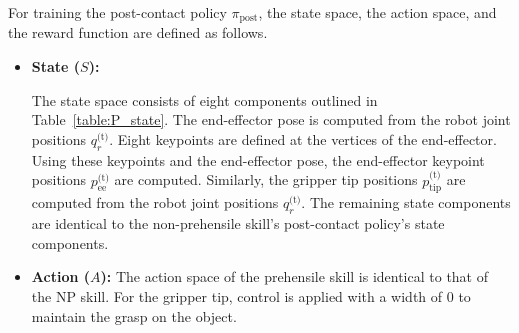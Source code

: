 For training the post-contact policy $\pi_\text{post}$, the state space, the action space, and the reward function are defined as follows. 

\begin{itemize}
    \medskip
    \item \textbf{State (\( S \)):}
    
    
    The state space consists of eight components outlined in Table~\ref{table:P_state}. %
     The end-effector pose is computed from the robot joint positions \( q^\text{(t)}_r \). Eight keypoints are defined at the vertices of the end-effector. Using these keypoints and the end-effector pose, the end-effector keypoint positions \( p^\text{(t)}_\text{ee} \) are computed. Similarly, the gripper tip positions \( p^\text{(t)}_\text{tip} \) are computed from the robot joint positions \( q^\text{(t)}_r \). The remaining state components are identical to the non-prehensile skill's post-contact policy's state components.
    

    \medskip
    
    \item \textbf{Action (\( A \)):} The action space of the prehensile skill is identical to that of the NP skill. For the gripper tip, control is applied with a width of 0 to maintain the grasp on the object.


\end{itemize}
